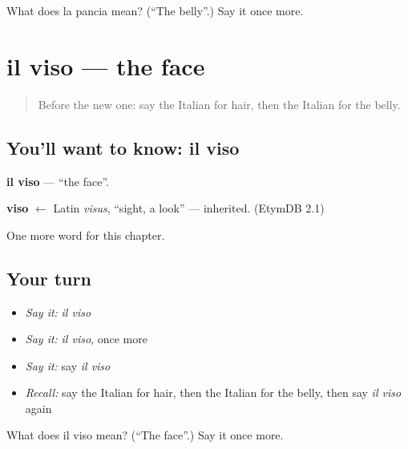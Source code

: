 \begin{tcolorbox}[breakable,colback=teal!4,colframe=teal!35!black,title={Before you move on}]
What does la pancia mean? (\textquotedblleft{}The belly\textquotedblright{}.) Say it once more.
\end{tcolorbox}
\section[il viso]{il viso — the face}

\label{lesson:IT-C39-viso}



\begin{quote}
Before the new one: say the Italian for hair, then the Italian for the belly.
\end{quote}

\subsection*{You'll want to know: il viso}
\textbf{il viso} — \textquotedblleft{}the face\textquotedblright{}.

\begin{cousinweb}
\textbf{viso} $\leftarrow$ Latin \emph{visus}, \textquotedblleft{}sight, a look\textquotedblright{} — inherited. (EtymDB 2.1)
\end{cousinweb}

\begin{grammarlens}[title={What you've built}]
One more word for this chapter.
\end{grammarlens}

\subsection*{Your turn}
\begin{itemize}
\raggedright
  \item \emph{Say it:} \emph{il viso}
  \item \emph{Say it:} \emph{il viso}, once more
  \item \emph{Say it:} say \emph{il viso}
  \item \emph{Recall:} say the Italian for hair, then the Italian for the belly, then say \emph{il viso} again
\end{itemize}

\begin{tcolorbox}[breakable,colback=teal!4,colframe=teal!35!black,title={Before you move on}]
What does il viso mean? (\textquotedblleft{}The face\textquotedblright{}.) Say it once more.
\end{tcolorbox}
